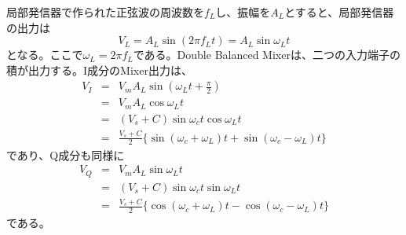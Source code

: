 局部発信器で作られた正弦波の周波数を$f_L$し、振幅を$A_L$とすると、局部発信器の出力は
\begin{equation}
V_L = A_L \sin(2 \pi f_L t) = A_L \sin\omega_Lt
\end{equation}
となる。ここで$\omega_L = 2\pi f_L$である。Double Balanced Mixerは、二つの入力端子の積が出力する。I成分のMixer出力は、
\begin{eqnarray}
V_I &=& V_mA_L\sin(\omega_Lt + \frac{\pi}{2}) \nonumber\\
&=& V_mA_L\cos\omega_Lt \nonumber\\
&=& (V_s + C)\sin\omega_ct\cos\omega_Lt \nonumber\\
&=& \frac{V_s + C}{2}\{\sin(\omega_c + \omega_L)t + \sin(\omega_c - \omega_L)t\} \label{eq:AM_I}
\end{eqnarray}
であり、Q成分も同様に
\begin{eqnarray}
V_Q &=& V_mA_L\sin\omega_Lt \nonumber\\
&=& (V_s + C)\sin\omega_ct\sin\omega_Lt \nonumber\\
&=& \frac{V_s + C}{2}\{\cos(\omega_c + \omega_L)t - \cos(\omega_c - \omega_L)t \}\label{eq:AM_Q}
\end{eqnarray}
である。
